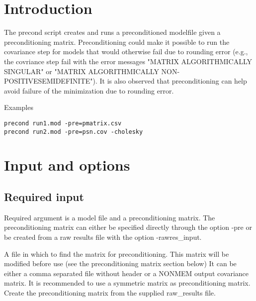 
\usepackage{color}
\usepackage{amsmath}



\maketitle

\section{Introduction}
The precond script creates and runs a preconditioned modelfile given a preconditioning matrix.
Preconditioning could make it possible to run the covariance step for models that would otherwise fail due to rounding error (e.g., the covriance step fail with the error messages "MATRIX ALGORITHMICALLY SINGULAR" or "MATRIX ALGORITHMICALLY NON-POSITIVESEMIDEFINITE"). It is also observed that preconditioning can help avoid failure of the minimization due to rounding error.


Examples
\begin{verbatim}
precond run1.mod -pre=pmatrix.csv
precond run2.mod -pre=psn.cov -cholesky
\end{verbatim}

\section{Input and options}

\subsection{Required input}
Required argument is a model file and a preconditioning matrix. The preconditioning matrix can either be specified directly through the option -pre or be created from a raw results file with the option -rawres\_input.

\begin{optionlist}

A file in which to find the matrix for preconditioning. This matrix will be modified before use (see the preconditioning matrix section below) It can be either a comma separated file without header or a NONMEM output covariance matrix. It is recommended to use a symmetric matrix as preconditioning matrix.
\nextopt
{}
Create the preconditioning matrix from the supplied raw\_results file.
\nextopt
\end{optionlist}

